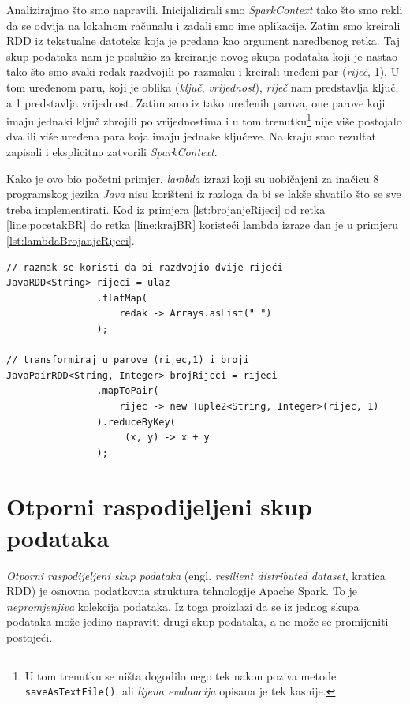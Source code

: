 \documentclass[times, utf8, zavrsni, numeric]{fer}
\begin{document}
\vspace{5mm}

Analizirajmo što smo napravili. Inicijalizirali smo \emph{SparkContext} tako što smo rekli da se odvija na lokalnom računalu i zadali smo ime aplikacije. Zatim smo kreirali RDD iz tekstualne datoteke koja je predana kao argument naredbenog retka. Taj skup podataka nam je poslužio za kreiranje novog skupa podataka koji je nastao tako što smo svaki redak razdvojili po razmaku i kreirali uređeni par (\emph{riječ}, 1). U tom uređenom paru, koji je oblika (\emph{ključ}, \emph{vrijednost}), \emph{riječ} nam predstavlja ključ, a 1 predstavlja vrijednost. Zatim smo iz tako uređenih parova, one parove koji imaju jednaki ključ zbrojili po vrijednostima i u tom trenutku\footnote{U tom trenutku se ništa dogodilo nego tek nakon poziva metode \texttt{saveAsTextFile()}, ali \emph{lijena evaluacija}  opisana je tek kasnije.} nije više postojalo dva ili više uređena para koja imaju jednake ključeve. Na kraju smo rezultat zapisali i eksplicitno zatvorili \emph{SparkContext}. 

Kako je ovo bio početni primjer, \emph{lambda} izrazi koji su uobičajeni za inačicu 8 programskog jezika \emph{Java} nisu korišteni iz razloga da bi se lakše shvatilo što se sve treba implementirati. Kod iz primjera \ref{lst:brojanjeRijeci} od retka \ref{line:pocetakBR} do retka \ref{line:krajBR} koristeći lambda izraze dan je u primjeru \ref{lst:lambdaBrojanjeRijeci}.
\vspace{5mm}
\begin{lstlisting}[label={lst:lambdaBrojanjeRijeci}, caption={Brojanje riječi koristeći lambda izraze.}]
// razmak se koristi da bi razdvojio dvije riječi
JavaRDD<String> rijeci = ulaz
				.flatMap(
					redak -> Arrays.asList(" ")
				);

// transformiraj u parove (rijec,1) i broji
JavaPairRDD<String, Integer> brojRijeci = rijeci
				.mapToPair(
				 	rijec -> new Tuple2<String, Integer>(rijec, 1)
				).reduceByKey(
					 (x, y) -> x + y
				);
\end{lstlisting}
\vspace{5mm}


\section{Otporni raspodijeljeni skup podataka} \label{RDD}
\emph{Otporni raspodijeljeni skup podataka} (engl. \emph{resilient distributed dataset}, kratica RDD) je osnovna podatkovna struktura tehnologije Apache Spark. To je \emph{nepromjenjiva}  kolekcija podataka. Iz toga proizlazi da se iz jednog skupa podataka može jedino napraviti drugi skup podataka, a ne može se promijeniti postojeći.
\end{document}
